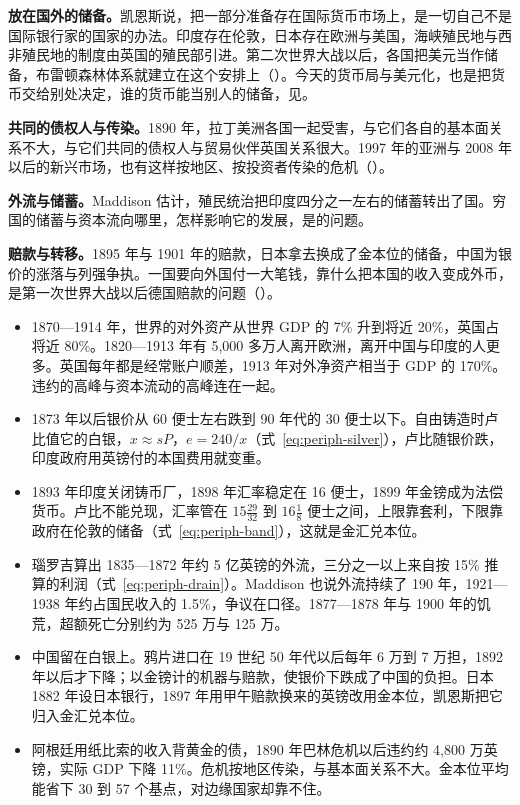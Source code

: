 \textbf{放在国外的储备。}凯恩斯说，把一部分准备存在国际货币市场上，是一切自己不是国际银行家的国家的办法\cite{keynes1913}。印度存在伦敦，日本存在欧洲与美国，海峡殖民地与西非殖民地的制度由英国的殖民部引进\cite{keynes1913}。第二次世界大战以后，各国把美元当作储备，布雷顿森林体系就建立在这个安排上（）。今天的货币局与美元化，也是把货币交给别处决定，谁的货币能当别人的储备，见。

\textbf{共同的债权人与传染。}1890 年，拉丁美洲各国一起受害，与它们各自的基本面关系不大，与它们共同的债权人与贸易伙伴英国关系很大\cite{mitchener2007}。1997 年的亚洲与 2008 年以后的新兴市场，也有这样按地区、按投资者传染的危机（）。

\textbf{外流与储蓄。}Maddison 估计，殖民统治把印度四分之一左右的储蓄转出了国\cite{maddison1971}。穷国的储蓄与资本流向哪里，怎样影响它的发展，是的问题。

\textbf{赔款与转移。}1895 年与 1901 年的赔款，日本拿去换成了金本位的储备，中国为银价的涨落与列强争执\cite{mitchener2009,qingshigao}。一国要向外国付一大笔钱，靠什么把本国的收入变成外币，是第一次世界大战以后德国赔款的问题（）。

\begin{takeaways}
\begin{itemize}
\item 1870—1914 年，世界的对外资产从世界 GDP 的 7\% 升到将近 20\%，英国占将近 80\%。1820—1913 年有 5,000 多万人离开欧洲，离开中国与印度的人更多。英国每年都是经常账户顺差，1913 年对外净资产相当于 GDP 的 170\%。违约的高峰与资本流动的高峰连在一起。
\item 1873 年以后银价从 60 便士左右跌到 90 年代的 30 便士以下。自由铸造时卢比值它的白银，$x\approx sP$，$e=240/x$（式~\eqref{eq:periph-silver}），卢比随银价跌，印度政府用英镑付的本国费用就变重。
\item 1893 年印度关闭铸币厂，1898 年汇率稳定在 16 便士，1899 年金镑成为法偿货币。卢比不能兑现，汇率管在 $15\tfrac{29}{32}$ 到 $16\tfrac18$ 便士之间，上限靠套利，下限靠政府在伦敦的储备（式~\eqref{eq:periph-band}），这就是金汇兑本位。
\item 瑙罗吉算出 1835—1872 年约 5 亿英镑的外流，三分之一以上来自按 15\% 推算的利润（式~\eqref{eq:periph-drain}）。Maddison 也说外流持续了 190 年，1921—1938 年约占国民收入的 1.5\%，争议在口径。1877—1878 年与 1900 年的饥荒，超额死亡分别约为 525 万与 125 万。
\item 中国留在白银上。鸦片进口在 19 世纪 50 年代以后每年 6 万到 7 万担，1892 年以后才下降；以金镑计的机器与赔款，使银价下跌成了中国的负担。日本 1882 年设日本银行，1897 年用甲午赔款换来的英镑改用金本位，凯恩斯把它归入金汇兑本位。
\item 阿根廷用纸比索的收入背黄金的债，1890 年巴林危机以后违约约 4,800 万英镑，实际 GDP 下降 11\%。危机按地区传染，与基本面关系不大。金本位平均能省下 30 到 57 个基点，对边缘国家却靠不住。
\end{itemize}
\end{takeaways}

